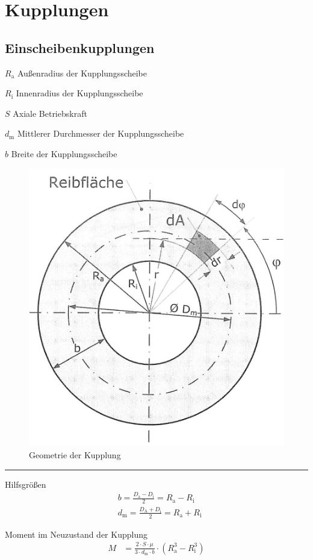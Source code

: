 \section{Kupplungen}

\subsection{Einscheibenkupplungen}
\begin{vardef}
	\item[$R_\text{a}$] Außenradius der Kupplungsscheibe
	\item[$R_\text{i}$] Innenradius der Kupplungsscheibe
	\item[$S$] Axiale Betriebskraft
	\item[$d_\text{m}$] Mittlerer Durchmesser der Kupplungsscheibe
	\item[$b$] Breite der Kupplungsscheibe
\end{vardef}

\begin{figure}[H]
	\centering
	\includegraphics[width=0.35\linewidth]{kupplungen/einscheibenkupplung.jpg}
	\caption*{Geometrie der Kupplung}
\end{figure}

\hrule
\begin{eeqn}{Hilfsgrößen}
	\begin{align}
		&b = \frac{D_\text{a}-D_\text{i}}{2} = R_\text{a} - R_\text{i}  \\
		&d_\text{m} = \frac{D_\text{A}+D_\text{i}}{2} =R_\text{a} + R_\text{i}
	\end{align}
\end{eeqn}

\begin{eeqn}{Moment im Neuzustand der Kupplung}
	\begin{align}
		M &= \frac{2\cdot S \cdot \mu}{3 \cdot d_\text{m} \cdot b} \cdot \left( R_\text{a}^3 - R_\text{i}^3\right)
	\end{align}
\end{eeqn}


